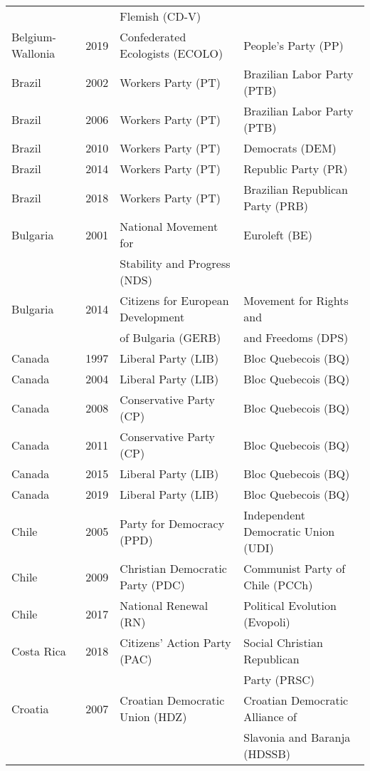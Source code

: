 {\begin{longtable}{|l|c|l|l|}
 &  & Flemish (CD-V) &   \\ 
Belgium-Wallonia & 2019 &  Confederated Ecologists (ECOLO) &  People's Party (PP)\\ 
%
Brazil & 2002 &   Workers Party (PT) &   Brazilian Labor Party (PTB) \\ 
  Brazil & 2006 &   Workers Party (PT) &   Brazilian Labor Party (PTB) \\ 
Brazil & 2010 &   Workers Party (PT) &   Democrats (DEM)  \\ 
Brazil & 2014 &   Workers Party (PT) &   Republic Party (PR)   \\ 
Brazil & 2018 &   Workers Party (PT) &   Brazilian Republican Party (PRB)  \\ 
%
Bulgaria & 2001 &   National Movement for   &   Euroleft (BE) \\ 
    &   &    Stability and Progress (NDS) &    \\ 
Bulgaria & 2014 &   Citizens for European Development   &   Movement for Rights and   \\ 
    &   &    of Bulgaria (GERB) &     and Freedoms (DPS) \\ 
%
Canada & 1997 &   Liberal Party (LIB) &   Bloc Quebecois (BQ)   \\ 
Canada & 2004 &   Liberal Party (LIB) &   Bloc Quebecois (BQ)   \\ 
Canada & 2008 &   Conservative Party (CP) &   Bloc Quebecois (BQ)   \\ 
  Canada & 2011 &   Conservative Party (CP) &   Bloc Quebecois (BQ)   \\ 
Canada & 2015 &   Liberal Party (LIB) &   Bloc Quebecois (BQ)   \\ 
Canada & 2019 &   Liberal Party (LIB) &   Bloc Quebecois (BQ)   \\ 
%
Chile & 2005 &   Party for Democracy (PPD) &   Independent Democratic Union (UDI) \\ 
  Chile & 2009 &   Christian Democratic Party (PDC) &   Communist Party of Chile (PCCh) \\ 
Chile & 2017 &   National Renewal (RN) &   Political Evolution (Evopoli) \\ 
%
Costa Rica & 2018 &   Citizens' Action Party (PAC) &   Social Christian Republican \\ 
               &      &       &    Party (PRSC)  \\ 
%
Croatia & 2007 &   Croatian Democratic Union (HDZ) &   Croatian Democratic Alliance of   \\ 
          &      &    &   Slavonia and Baranja (HDSSB) \\ 

\end{longtable}}
